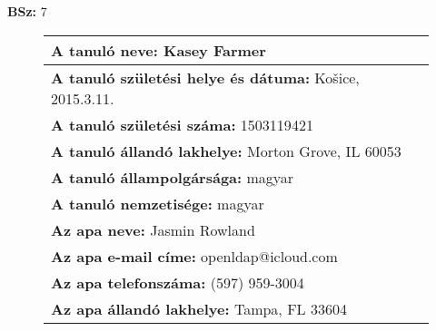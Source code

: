 \documentclass[10pt,a4paper]{article}
\begin{document}
    \vfill
    \textbf{BSz: }7
\newpage
    \begin{figure}[!ht]
    \begin{tabular}{|m{\textwidth}|}
    \hline \vspace{3pt}
    \textbf{A tanuló neve:} \hspace{0.5cm} Kasey Farmer \vspace{3pt} \\
\hline\vspace{3pt}
\textbf{A tanuló születési helye és dátuma:} \hspace{0.5cm} Košice, 2015.3.11. \vspace{3pt} \\
\hline\vspace{3pt}
\textbf{A tanuló születési száma:} \hspace{0.5cm} 1503119421 \vspace{3pt} \\
\hline\vspace{3pt}
\textbf{A tanuló állandó lakhelye:} \hspace{0.5cm} Morton Grove, IL 60053 \vspace{3pt} \\
\hline\vspace{3pt}
\textbf{A tanuló állampolgársága:} \hspace{0.5cm} magyar \vspace{3pt} \\
\hline\vspace{3pt}
\textbf{A tanuló nemzetisége:} \hspace{0.5cm} magyar \vspace{3pt} \\
\hline\vspace{3pt}
\textbf{Az apa neve:} \hspace{0.5cm} Jasmin Rowland \vspace{3pt} \\
\hline\vspace{3pt}
\textbf{Az apa e-mail címe:} \hspace{0.5cm} openldap@icloud.com \vspace{3pt} \\
\hline\vspace{3pt}
\textbf{Az apa telefonszáma:} \hspace{0.5cm} (597) 959-3004 \vspace{3pt} \\
\hline\vspace{3pt}
\textbf{Az apa állandó lakhelye:} \hspace{0.5cm} Tampa, FL 33604 \vspace{3pt} \\

\end{tabular}
\end{figure}
\end{document}
